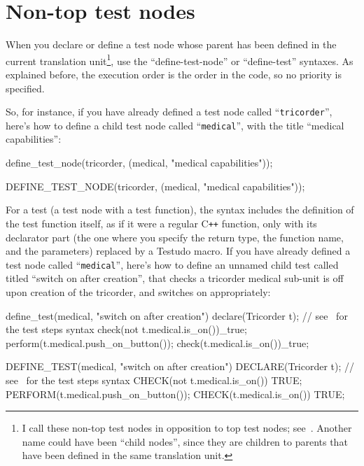 \documentclass[twoside, a4paper, article]{memoir}
\newcommand*\Cpp{C\texttt{++}}
\begin{document}
\section{Non-top test nodes}
\label{sec:non-top-test-nodes}

When you declare or define a test node whose parent has been defined in the
current translation unit\footnote{I call these non-top test nodes in opposition
  to top test nodes; see~.  Another name could have
  been ``child nodes'', since they are children to parents that have been
  defined in the same translation unit.}, use the ``define-test-node'' or
``define-test'' syntaxes.  As explained before, the execution order is the
order in the code, so no priority is specified.

So, for instance, if you have already defined a test node called
``\texttt{tricorder}'', here's how to define a child test node called
``\texttt{medical}'', with the title ``medical capabilities'':
\begin{cpplisting}
define_test_node(tricorder,
                 (medical, "medical capabilities"));
\end{cpplisting}

\begin{cpplisting}
DEFINE_TEST_NODE(tricorder,
                 (medical, "medical capabilities"));
\end{cpplisting}

For a test (a test node with a test function), the syntax includes the
definition of the test function itself, as if it were a regular \Cpp{}
function, only with its declarator part (the one where you specify the return
type, the function name, and the parameters) replaced by a Testudo macro.  If
you have already defined a test node called ``\texttt{medical}'', here's how to
define an unnamed child test called titled ``switch on after creation'', that
checks a tricorder medical sub-unit is off upon creation of the tricorder, and
switches on appropriately:
\begin{cpplisting}
define_test(medical, "switch on after creation") {
  declare(Tricorder t); // see~ for the test steps syntax
  check(not t.medical.is_on())_true;
  perform(t.medical.push_on_button());
  check(t.medical.is_on())_true;
}
\end{cpplisting}

\begin{cpplisting}
DEFINE_TEST(medical, "switch on after creation")
{
  DECLARE(Tricorder t); // see~ for the test steps syntax
  CHECK(not t.medical.is_on()) TRUE;
  PERFORM(t.medical.push_on_button());
  CHECK(t.medical.is_on()) TRUE;
}
\end{cpplisting}
\end{document}
